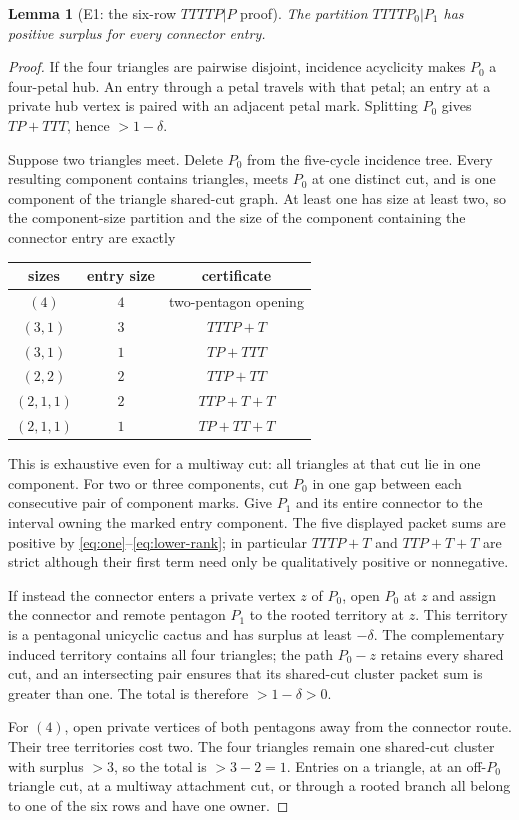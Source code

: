 \documentclass[11pt]{article}
\newtheorem{lemma}[theorem]{Lemma}
\begin{document}
\begin{lemma}[E1: the six-row $TTTTP|P$ proof]\label{lem:e1}
The partition $TTTTP_0|P_1$ has positive surplus for every connector entry.
\end{lemma}
\begin{proof}
If the four triangles are pairwise disjoint, incidence acyclicity makes $P_0$
a four-petal hub.  An entry through a petal travels with that petal; an entry at
a private hub vertex is paired with an adjacent petal mark.  Splitting $P_0$
gives $TP+TTT$, hence $>1-\delta$.

Suppose two triangles meet.  Delete $P_0$ from the five-cycle incidence tree.
Every resulting component contains triangles, meets $P_0$ at one distinct cut,
and is one component of the triangle shared-cut graph.  At least one has size
at least two, so the component-size partition and the size of the component containing
the connector entry are exactly
\begin{center}
\begin{tabular}{c c c}
sizes & entry size & certificate\\ \hline
$(4)$&$4$&two-pentagon opening\\
$(3,1)$&$3$&$TTTP+T$\\
$(3,1)$&$1$&$TP+TTT$\\
$(2,2)$&$2$&$TTP+TT$\\
$(2,1,1)$&$2$&$TTP+T+T$\\
$(2,1,1)$&$1$&$TP+TT+T$
\end{tabular}
\end{center}
This is exhaustive even for a multiway cut: all triangles at that cut lie in
one component.  For two or three components, cut $P_0$ in one gap between each
consecutive pair of component marks.  Give $P_1$ and its entire connector to
the interval owning the marked entry component.  The five displayed packet
sums are positive by \eqref{eq:one}--\eqref{eq:lower-rank}; in particular
$TTTP+T$ and $TTP+T+T$ are strict although their first term need only be
qualitatively positive or nonnegative.

If instead the connector enters a private vertex $z$ of $P_0$, open $P_0$ at
$z$ and assign the connector and remote pentagon $P_1$ to the rooted territory
at $z$.  This territory is a pentagonal unicyclic cactus and has surplus at
least $-\delta$.  The complementary induced territory contains all four
triangles; the path $P_0-z$ retains every shared cut, and an intersecting pair
ensures that its shared-cut cluster packet sum is greater than one.  The total
is therefore $>1-\delta>0$.

For $(4)$, open private vertices of both pentagons away from the connector
route.  Their tree territories cost two.  The four triangles remain one
shared-cut cluster with surplus $>3$, so the total is $>3-2=1$.  Entries on a
triangle, at an off-$P_0$ triangle cut, at a multiway attachment cut, or through
a rooted branch all belong to one of the six rows and have one owner.
\end{proof}
\end{document}
